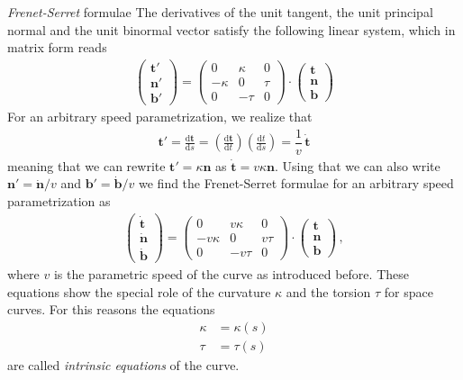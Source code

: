 \documentclass[11pt, DINA4, fleqn]{amsart}
\def\df{\mathrm{d}\xspace}
\newcommand{\dd}[2]{\frac{\df#1}{\df#2}}
\def\vt{\boldsymbol{t}\xspace}
\def\vn{\boldsymbol{n}\xspace}
\def\vb{\boldsymbol{b}\xspace}
\begin{document}
\begin{mybox_tc3}{\emph{Frenet-Serret} formulae}
	The derivatives of the unit tangent, the unit principal normal and the unit binormal vector satisfy the following linear system, which in matrix form reads
\begin{align}
\begin{pmatrix}
\vt' \\ \vn' \\ \vb'
\end{pmatrix} = 
\begin{pmatrix}
0 & \kappa & 0\\
-\kappa & 0 & \tau \\
0 & - \tau & 0 
\end{pmatrix} 
\cdot
\begin{pmatrix}
\vt \\ \vn \\ \vb
\end{pmatrix} 
\end{align}
For an arbitrary speed parametrization, we realize that
\begin{align}
\vt' = \dd{\vt}{s} = \left(\dd{\vt}{t}\right) \left(\dd{t}{s}\right) = \dfrac{1}{v} \, \dot{\vt}
\end{align}
meaning that we can rewrite $\vt' = \kappa \vn$ as
$\dot{\vt} = v\kappa \vn$. Using that we can also write $\vn' = \dot{\vn}/v$ and $\vb' = \dot{\vb}/v$ we find the Frenet-Serret formulae for an arbitrary speed parametrization as
\begin{align}
\begin{pmatrix}
\dot{\vt} \\ \dot{\vn} \\ \dot{\vb}
\end{pmatrix} = 
\begin{pmatrix}
0 & v\kappa & 0\\
-v\kappa & 0 & v\tau \\
0 & - v\tau & 0 
\end{pmatrix} 
\cdot
\begin{pmatrix}
\vt \\ \vn \\ \vb
\end{pmatrix}  \, ,
\end{align}
where $v$ is the parametric speed of the curve as introduced before.
These equations show the special role of the curvature $\kappa$ and the torsion $\tau$ for space curves. For this reasons the equations
\begin{align}
\kappa &= \kappa(s) \\
\tau &= \tau(s)
\end{align}
are called \emph{intrinsic equations} of the curve.
\end{mybox_tc3}
\end{document}
